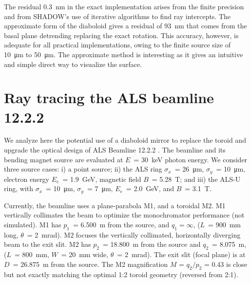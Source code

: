 \documentclass{iucr}       %
\begin{document}
The residual \SI{0.3}{\nano\meter} in the exact implementation arises from the finite precision and from SHADOW's use of iterative algorithms to find ray intercepts.
The approximate form of the diaboloid gives a residual of \SI{93}{\nano\meter} that comes from the basal plane detrending replacing the exact rotation. This accuracy, however, is adequate for all practical implementations, owing to the finite source size of \SI{10}{\micro\meter} to \SI{50}{\micro\meter}. The approximate method is interesting as it gives an intuitive and simple direct way to visualize the surface.

\section{Ray tracing the ALS beamline 12.2.2}
\label{sec:beamline}

We analyze here the potential use of a diaboloid mirror to replace the toroid and upgrade the optical design of ALS Beamline 12.2.2 \cite{bl1222,MacDowell2004}. The beamline and its bending magnet source are evaluated at $E$~= \SI{30}{\kilo\electronvolt} photon energy. We consider three source cases: i) a point source; ii) the ALS ring
$\sigma_x$~= \SI{26}{\micro\meter}, $\sigma_y$~= \SI{10}{\micro\meter}, 
electron energy $E_e$~= \SI{1.9}{\giga\electronvolt}, magnetic field $B$~= \SI{5.28}{\tesla}; and iii) the ALS-U ring, with $\sigma_x$~= \SI{10}{\micro\meter}, $\sigma_y$~= \SI{7}{\micro\meter}, $E_e$~= \SI{2.0}{\giga\electronvolt}, and $B$~= \SI{3.1}{\tesla}. 

Currently, the beamline uses a plane-parabola M1, and a toroidal M2. M1 vertically collimates the beam to optimize the monochromator performance (not simulated). M1 has $p_1$~= \SI{6.500}{\meter} from the source, and $q_1 = \infty$, ($L$~= \SI{900}{\milli\meter} long, $\theta$~= \SI{2}{\milli\radian}). M2 focuses the vertically collimated, horizontally diverging beam to the exit slit. M2 has $p_2$~= \SI{18.800}{\meter} from the source and $q_2$~= \SI{8.075}{\meter}, ($L$~= \SI{800}{\milli\meter}, $W$~= \SI{20}{\milli\meter} wide, $\theta$~= \SI{2}{\milli\radian}). The exit slit (focal plane) is at $D$~= \SI{26.875}{\meter} from the source. The M2 magnification $M$ = $q_2/p_2$ = 0.43 is close but not exactly matching the optimal 1:2 toroid geometry \cite{MacDowell2004} (reversed from 2:1).
\end{document}
